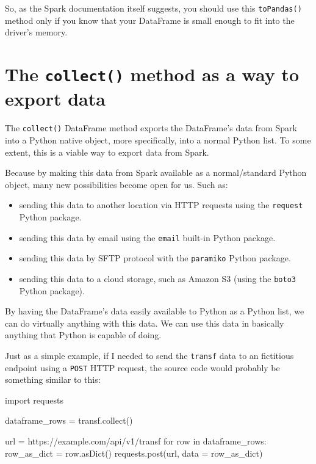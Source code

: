\documentclass[
  11pt,
  letterpaper,
  DIV=11,
  numbers=noendperiod]{scrreprt}
\newenvironment{Shaded}{\begin{snugshade}}{\end{snugshade}}
\newcommand{\ControlFlowTok}[1]{\textcolor[rgb]{0.00,0.23,0.31}{#1}}
\newcommand{\ImportTok}[1]{\textcolor[rgb]{0.00,0.46,0.62}{#1}}
\newcommand{\KeywordTok}[1]{\textcolor[rgb]{0.00,0.23,0.31}{#1}}
\newcommand{\NormalTok}[1]{\textcolor[rgb]{0.00,0.23,0.31}{#1}}
\newcommand{\OperatorTok}[1]{\textcolor[rgb]{0.37,0.37,0.37}{#1}}
\newcommand{\StringTok}[1]{\textcolor[rgb]{0.13,0.47,0.30}{#1}}
\providecommand{\tightlist}{%
  \setlength{\itemsep}{0pt}\setlength{\parskip}{0pt}}\usepackage{longtable,booktabs,array}
\begin{document}
So, as the Spark documentation itself suggests, you should use this
\texttt{toPandas()} method only if you know that your DataFrame is small
enough to fit into the driver's memory.

\section{\texorpdfstring{The \texttt{collect()} method as a way to
export
data}{The collect() method as a way to export data}}\label{the-collect-method-as-a-way-to-export-data}

The \texttt{collect()} DataFrame method exports the DataFrame's data
from Spark into a Python native object, more specifically, into a normal
Python list. To some extent, this is a viable way to export data from
Spark.

Because by making this data from Spark available as a normal/standard
Python object, many new possibilities become open for us. Such as:

\begin{itemize}
\tightlist
\item
  sending this data to another location via HTTP requests using the
  \texttt{request} Python package.
\item
  sending this data by email using the \texttt{email} built-in Python
  package.
\item
  sending this data by SFTP protocol with the \texttt{paramiko} Python
  package.
\item
  sending this data to a cloud storage, such as Amazon S3 (using the
  \texttt{boto3} Python package).
\end{itemize}

By having the DataFrame's data easily available to Python as a Python
list, we can do virtually anything with this data. We can use this data
in basically anything that Python is capable of doing.

Just as a simple example, if I needed to send the \texttt{transf} data
to an fictitious endpoint using a \texttt{POST} HTTP request, the source
code would probably be something similar to this:

\begin{Shaded}
\begin{Highlighting}[]
\ImportTok{import}\NormalTok{ requests}

\NormalTok{dataframe\_rows }\OperatorTok{=}\NormalTok{ transf.collect()}

\NormalTok{url }\OperatorTok{=} \StringTok{\textquotesingle{}https://example.com/api/v1/transf\textquotesingle{}}
\ControlFlowTok{for}\NormalTok{ row }\KeywordTok{in}\NormalTok{ dataframe\_rows:}
\NormalTok{    row\_as\_dict }\OperatorTok{=}\NormalTok{ row.asDict()}
\NormalTok{    requests.post(url, data }\OperatorTok{=}\NormalTok{ row\_as\_dict)}
\end{Highlighting}
\end{Shaded}
\end{document}
